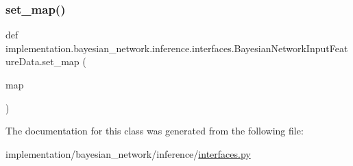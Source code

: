 \subsubsection{\texorpdfstring{set\+\_\+map()}{set\_map()}}
{\footnotesize\ttfamily def implementation.\+bayesian\+\_\+network.\+inference.\+interfaces.\+Bayesian\+Network\+Input\+Feature\+Data.\+set\+\_\+map (\begin{DoxyParamCaption}\item[{}]{map }\end{DoxyParamCaption})\hspace{0.3cm}{\ttfamily [static]}}



The documentation for this class was generated from the following file\+:\begin{DoxyCompactItemize}
\item 
implementation/bayesian\+\_\+network/inference/\hyperlink{interfaces_8py}{interfaces.\+py}\end{DoxyCompactItemize}
